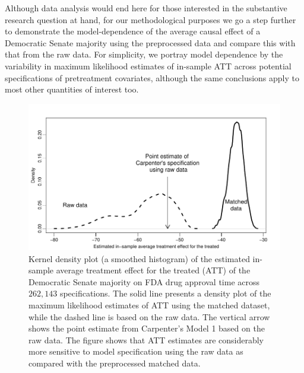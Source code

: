\documentclass[11pt,titlepage]{article}
\begin{document}
Although data analysis would end here for those interested in the
substantive research question at hand, for our methodological purposes
we go a step further to demonstrate the model-dependence of the
average causal effect of a Democratic Senate majority using the
preprocessed data and compare this with that from the raw data.  For
simplicity, we portray model dependence by the variability in maximum
likelihood estimates of in-sample ATT across potential specifications
of pretreatment covariates, although the same conclusions apply to
most other quantities of interest too.

\begin{figure}[t] 
 \begin{center}
   \includegraphics{figs/fdadens.pdf}
  \end{center}
  \vspace{-0.15in}
  \caption{Kernel density plot (a smoothed histogram)
    of the estimated in-sample average treatment effect for the
    treated (ATT) of the Democratic Senate majority on FDA drug
    approval time across $262,143$ specifications. The solid line
    presents a density plot of the maximum likelihood estimates of ATT
    using the matched dataset, while the dashed line is based on the
    raw data.  The vertical arrow shows the point estimate from
    Carpenter's Model 1 based on the raw data.  The figure shows that
    ATT estimates are considerably more sensitive to model
    specification using the raw data as compared with the preprocessed
    matched data.}
  \label{fg:fdadens}
\end{figure}
\end{document}
